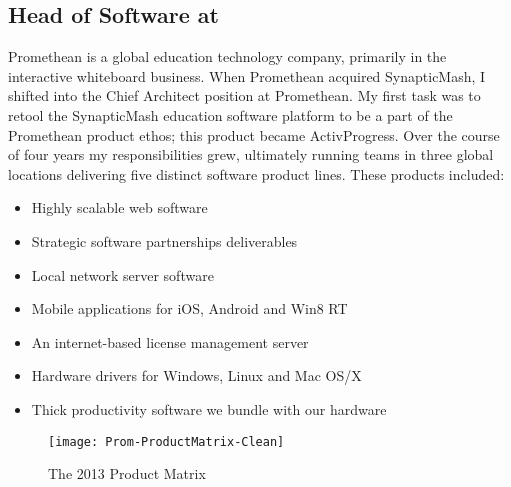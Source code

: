 \subsection{\textbf{Head of Software} at  \shyears{[2010-2014]}}
Promethean is a global education technology company, primarily in the interactive whiteboard business.  When Promethean acquired SynapticMash, I shifted into the Chief Architect position at Promethean.  My first task was to retool the SynapticMash education software platform to be a part of the Promethean product ethos; this product became ActivProgress.  Over the course of four years my responsibilities grew, ultimately running teams in three global locations delivering five distinct software product lines.  These products included:
\begin{itemize}
\itemsep-0.5em
\item{Highly scalable web software}
\item{Strategic software partnerships deliverables}
\item{Local network server software}
\item{Mobile applications for iOS, Android and Win8 RT}
\item{An internet-based license management server}
\item{Hardware drivers for Windows, Linux and Mac OS/X}
\item{Thick productivity software we bundle with our hardware}
\end{itemize}

\begin{centering}
\begin{figure}%
  \texttt{[image: Prom-ProductMatrix-Clean]}
  \caption{The 2013 Product Matrix}
  \label{fig:PromSide}
\end{figure}
\end{centering}

